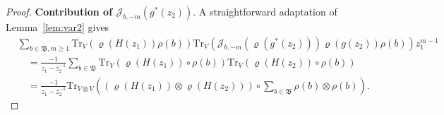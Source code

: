 \documentclass[12pt,a4paper]{amsart}
\numberwithin{equation}{section}
\theoremstyle{remark}
\theoremstyle{definition}
\newcommand{\kB}{\mathfrak B}
\newcommand{\cJ}{\mathcal J}
\begin{document}
\begin{proof}
\smallskip

\textbf{Contribution of $\cJ_{b,-m}(g^*(z_2))$}. A straightforward adaptation of Lemma~\ref{lem:var2} gives 
\begin{align*}
&\sum_{b\in\kB,m\geq1}\mathrm{Tr}_V\left(\varrho(H(z_1))\rho(b)\right)\mathrm{Tr}_V\left(\cJ_{b,-m}(\varrho(g^*(z_2)))\varrho(g(z_2))\rho(b)\right)z_1^{m-1}\\
&\quad=\frac{-1}{z_1-\bar z_2^{-1}}\sum_{b\in\kB}\mathrm{Tr}_V\left(\varrho(H(z_1))\circ\rho(b)\right)\mathrm{Tr}_V\left(\varrho(H(z_2))\circ\rho(b)\right)\\
    &\quad=\frac{-1}{z_1-\bar z_2^{-1}}\mathrm{Tr}_{V\otimes V}\left(\left(\varrho(H(z_1))\otimes\varrho(H(z_2))\right)\circ\sum_{b\in\kB}\rho(b)\otimes\rho(b)\right).
\end{align*}

\smallskip


\end{proof}
\end{document}
